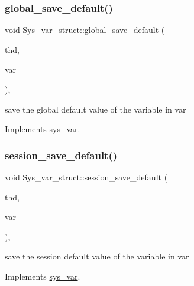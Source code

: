 \subsubsection{\texorpdfstring{global\+\_\+save\+\_\+default()}{global\_save\_default()}}
{\footnotesize\ttfamily void Sys\+\_\+var\+\_\+struct\+::global\+\_\+save\+\_\+default (\begin{DoxyParamCaption}\item[{T\+HD $\ast$}]{thd,  }\item[{\mbox{\hyperlink{classset__var}{set\+\_\+var}} $\ast$}]{var }\end{DoxyParamCaption})\hspace{0.3cm}{\ttfamily [inline]}, {\ttfamily [virtual]}}

save the global default value of the variable in var 

Implements \mbox{\hyperlink{classsys__var}{sys\+\_\+var}}.

\mbox{\label{classSys__var__struct_a60a7f923174571ad48a593694267b7c7}} 
\subsubsection{\texorpdfstring{session\+\_\+save\+\_\+default()}{session\_save\_default()}}
{\footnotesize\ttfamily void Sys\+\_\+var\+\_\+struct\+::session\+\_\+save\+\_\+default (\begin{DoxyParamCaption}\item[{T\+HD $\ast$}]{thd,  }\item[{\mbox{\hyperlink{classset__var}{set\+\_\+var}} $\ast$}]{var }\end{DoxyParamCaption})\hspace{0.3cm}{\ttfamily [inline]}, {\ttfamily [virtual]}}

save the session default value of the variable in var 

Implements \mbox{\hyperlink{classsys__var}{sys\+\_\+var}}.

\mbox{\label{classSys__var__struct_a7b5ac3196a09a38b6439c25d63e30e8f}} 
